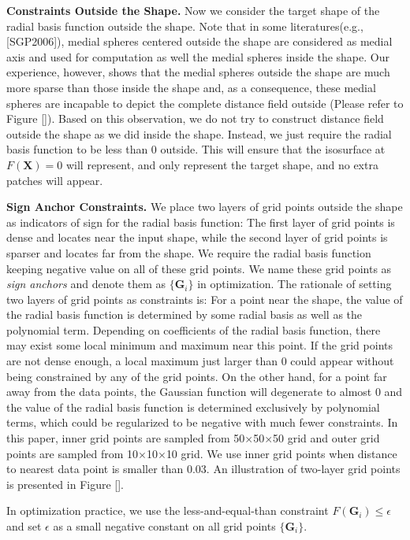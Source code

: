 \documentclass[review]{acmsiggraph}
\begin{document}
\textbf{Constraints Outside the Shape. }
Now we consider the target shape of the radial basis function outside the shape. Note that in some literatures(e.g., [SGP2006]), medial spheres centered outside the shape are considered as medial axis and used for computation as well the medial spheres inside the shape. Our experience, however, shows that the medial spheres outside the shape are much more sparse than those inside the shape and, as a consequence, these medial spheres are incapable to depict the complete distance field outside (Please refer to Figure []). Based on this observation, we do not try to construct distance field outside the shape as we did inside the shape. Instead, we just require the radial basis function to be less than 0 outside. This will ensure that the isosurface at $F(\mathbf{X})=0$ will represent, and only represent the target shape, and no extra patches will appear. 

\textbf{Sign Anchor Constraints. }
We place two layers of grid points outside the shape as indicators of sign for the radial basis function: The first layer of grid points is dense and locates near the input shape, while the second layer of grid points is sparser and locates far from the shape. We require the radial basis function keeping negative value on all of these grid points. We name these grid points as \textit{sign anchors} and denote them as $\{\mathbf{G}_i\}$ in optimization. The rationale of setting two layers of grid points as constraints is: For a point near the shape, the value of the radial basis function is determined by some radial basis as well as the polynomial term. Depending on coefficients of the radial basis function, there may exist some local minimum and maximum near this point. If the grid points are not dense enough, a local maximum just larger than 0 could appear without being constrained by any of the grid points. On the other hand, for a point far away from the data points, the Gaussian function will degenerate to almost 0 and the value of the radial basis function is determined exclusively by polynomial terms, which could be regularized to be negative with much fewer constraints. In this paper, inner grid points are sampled from 50$\times$50$\times$50 grid and outer grid points are sampled from 10$\times$10$\times$10 grid. We use inner grid points when distance to nearest data point is smaller than 0.03. An illustration of two-layer grid points is presented in Figure [].

In optimization practice, we use the less-and-equal-than constraint $F(\mathbf{G}_i)\le\epsilon$ and set $\epsilon$ as a small negative constant on all grid points $\{\mathbf{G}_i\}$.
\end{document}
